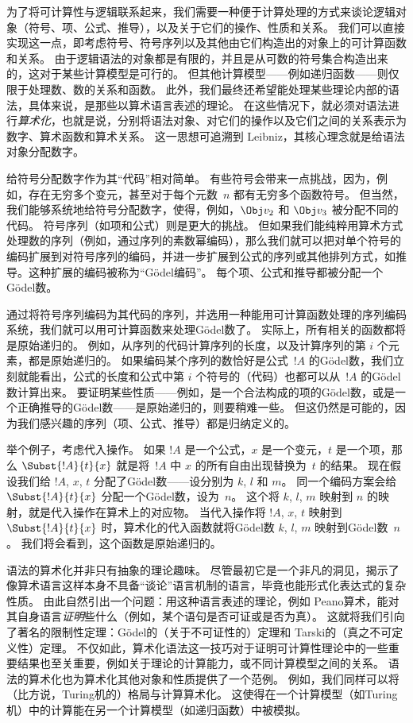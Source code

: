\documentclass[../../../include/open-logic-section]{subfiles}
\begin{document}


为了将可计算性与逻辑联系起来，我们需要一种便于计算处理的方式来谈论逻辑对象（符号、项、公式、推导），以及关于它们的操作、性质和关系。
我们可以直接实现这一点，即考虑符号、符号序列以及其他由它们构造出的对象上的可计算函数和关系。
由于逻辑语法的对象都是有限的，并且是从可数的符号集合构造出来的，这对于某些计算模型是可行的。
但其他计算模型——例如递归函数——则仅限于处理数、数的关系和函数。
此外，我们最终还希望能处理某些理论内部的语法，具体来说，是那些以算术语言表述的理论。
在这些情况下，就必须对语法进行\emph{算术化}，也就是说，分别将语法对象、对它们的操作以及它们之间的关系表示为数字、算术函数和算术关系。
这一思想可追溯到 Leibniz，其核心理念就是给语法对象分配数字。

给符号分配数字作为其“代码”相对简单。
有些符号会带来一点挑战，因为，例如，存在无穷多个变元，甚至对于每个元数~$n$ 都有无穷多个函数符号。
但当然，我们能够系统地给符号分配数字，使得，例如，$\Obj v_2$ 和 $\Obj v_3$ 被分配不同的代码。
符号序列（如项和公式）则是更大的挑战。
但如果我们能纯粹用算术方式处理数的序列（例如，通过序列的素数幂编码），那么我们就可以把对单个符号的编码扩展到对符号序列的编码，并进一步扩展到公式的序列或其他排列方式，如推导。这种扩展的编码被称为“Gödel编码”。
每个项、公式和推导都被分配一个Gödel数。

通过将符号序列编码为其代码的序列，并选用一种能用可计算函数处理的序列编码系统，我们就可以用可计算函数来处理Gödel数了。
实际上，所有相关的函数都将是原始递归的。
例如，从序列的代码计算序列的长度，以及计算序列的第 $i$ 个元素，都是原始递归的。
如果编码某个序列的数恰好是公式~$!A$ 的Gödel数，我们立刻就能看出，公式的长度和公式中第 $i$ 个符号的（代码）也都可以从~$!A$ 的Gödel数计算出来。
要证明某些性质——例如，是一个合法构成的项的Gödel数，或是一个正确推导的Gödel数——是原始递归的，则要稍难一些。
但这仍然是可能的，因为我们感兴趣的序列（项、公式、推导）都是归纳定义的。

举个例子，考虑代入操作。
如果 $!A$ 是一个公式，$x$ 是一个变元，$t$ 是一个项，那么 $\Subst{!A}{t}{x}$ 就是将~$!A$ 中 $x$ 的所有自由出现替换为~$t$ 的结果。
现在假设我们给 $!A$, $x$, $t$ 分配了Gödel数——设分别为 $k$, $l$ 和 $m$。
同一个编码方案会给 $\Subst{!A}{t}{x}$ 分配一个Gödel数，设为~$n$。
这个将 $k$, $l$, $m$ 映射到 $n$ 的映射，就是代入操作在算术上的对应物。
当代入操作将 $!A$, $x$, $t$ 映射到 $\Subst{!A}{t}{x}$ 时，算术化的代入函数就将Gödel数 $k$, $l$, $m$ 映射到Gödel数~$n$。
我们将会看到，这个函数是原始递归的。

语法的算术化并非只有抽象的理论趣味。
尽管最初它是一个非凡的洞见，揭示了像算术语言这样本身不具备“谈论”语言机制的语言，毕竟也能形式化表达式的复杂性质。
由此自然引出一个问题：用这种语言表述的理论，例如 Peano算术，能对其自身语言\emph{证明}些什么（例如，某个语句是否可证或是否为真）。
这就将我们引向了著名的限制性定理：Gödel的（关于不可证性的）定理和 Tarski的（真之不可定义性）定理。
不仅如此，算术化语法这一技巧对于证明可计算性理论中的一些重要结果也至关重要，例如关于理论的计算能力，或不同计算模型之间的关系。
语法的算术化也为算术化其他对象和性质提供了一个范例。
例如，我们同样可以将（比方说，Turing机的）格局与计算算术化。
这使得在一个计算模型（如Turing机）中的计算能在另一个计算模型（如递归函数）中被模拟。
\end{document}
